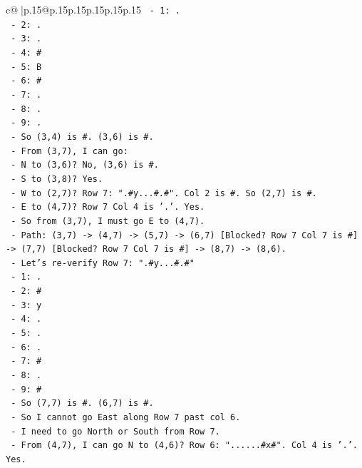 \documentclass{article}
\begin{document}
{\begin{supertabular}{c@{$\;$}|p{.15\linewidth}@{}p{.15\linewidth}p{.15\linewidth}p{.15\linewidth}p{.15\linewidth}p{.15\linewidth}}
{{{\texttt{       {-} 1: .} \\
\texttt{       {-} 2: .} \\
\texttt{       {-} 3: .} \\
\texttt{       {-} 4: \#} \\
\texttt{       {-} 5: B} \\
\texttt{       {-} 6: \#} \\
\texttt{       {-} 7: .} \\
\texttt{       {-} 8: .} \\
\texttt{       {-} 9: .} \\
\texttt{     {-} So (3,4) is \#. (3,6) is \#.} \\
\texttt{     {-} From (3,7), I can go:} \\
\texttt{       {-} N to (3,6)? No, (3,6) is \#.} \\
\texttt{       {-} S to (3,8)? Yes.} \\
\texttt{       {-} W to (2,7)? Row 7: ".\#y...\#.\#". Col 2 is \#. So (2,7) is \#.} \\
\texttt{       {-} E to (4,7)? Row 7 Col 4 is '.'. Yes.} \\
\texttt{     {-} So from (3,7), I must go E to (4,7).} \\
\texttt{     {-} Path: (3,7) {-}> (4,7) {-}> (5,7) {-}> (6,7) {[}Blocked? Row 7 Col 7 is \#{]} {-}> (7,7) {[}Blocked? Row 7 Col 7 is \#{]} {-}> (8,7) {-}> (8,6).} \\
\texttt{     {-} Let's re{-}verify Row 7: ".\#y...\#.\#"} \\
\texttt{       {-} 1: .} \\
\texttt{       {-} 2: \#} \\
\texttt{       {-} 3: y} \\
\texttt{       {-} 4: .} \\
\texttt{       {-} 5: .} \\
\texttt{       {-} 6: .} \\
\texttt{       {-} 7: \#} \\
\texttt{       {-} 8: .} \\
\texttt{       {-} 9: \#} \\
\texttt{     {-} So (7,7) is \#. (6,7) is \#.} \\
\texttt{     {-} So I cannot go East along Row 7 past col 6.} \\
\texttt{     {-} I need to go North or South from Row 7.} \\
\texttt{     {-} From (4,7), I can go N to (4,6)? Row 6: "......\#x\#". Col 4 is '.'. Yes.} \\
}}}
\end{supertabular}}
\end{document}

